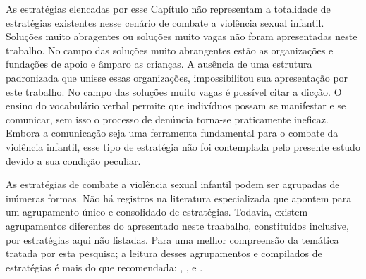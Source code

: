 \vspace{-0.35cm}

As estratégias elencadas por esse Capítulo não representam a totalidade de estratégias existentes nesse cenário de combate a violência sexual infantil. Soluções muito abragentes ou soluções muito vagas não foram apresentadas neste trabalho. No campo das soluções muito abrangentes estão as organizações e fundações de apoio e âmparo as crianças. %
A ausência de uma estrutura padronizada que unisse essas organizações, impossibilitou sua apresentação por este trabalho. No campo das soluções muito vagas é possível citar a dicção. O ensino do vocabulário verbal permite que indivíduos possam se manifestar e se comunicar, sem isso o processo de denúncia torna-se praticamente ineficaz. Embora a comunicação seja uma ferramenta fundamental para o combate da violência infantil, esse tipo de estratégia não foi contemplada pelo presente estudo devido a sua condição peculiar. 




\vspace{-0.35cm}

As estratégias de combate a violência sexual infantil podem ser agrupadas de inúmeras formas. Não há registros na literatura especializada que apontem para um agrupamento único e consolidado de estratégias. Todavia, existem  agrupamentos diferentes do apresentado neste traabalho, constituidos inclusive, por estratégias aqui não listadas. Para uma melhor compreensão da temática tratada por esta pesquisa; a leitura desses agrupamentos e compilados de estratégias é mais do que recomendada: , ,  e .





